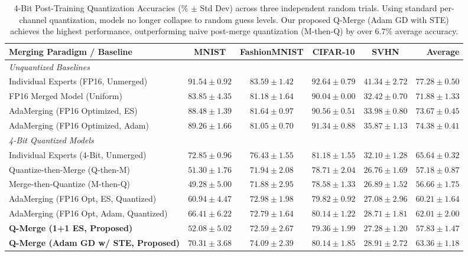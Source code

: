 \begin{table}[t]
\caption{4-Bit Post-Training Quantization Accuracies (\% $\pm$ Std Dev) across three independent random trials. Using standard per-channel quantization, models no longer collapse to random guess levels. Our proposed Q-Merge (Adam GD with STE) achieves the highest performance, outperforming naive post-merge quantization (M-then-Q) by over 6.7\% average accuracy.}
\label{tab:4bit_results}
\vskip 0.15in
\begin{center}
\begin{small}
\begin{sc}
\setlength{\tabcolsep}{4pt}
\begin{tabular}{lccccr}
\toprule
Merging Paradigm / Baseline & MNIST & FashionMNIST & CIFAR-10 & SVHN & \textbf{Average} \\
\midrule
\textit{Unquantized Baselines} \\
Individual Experts (FP16, Unmerged) & $91.54 \pm 0.92$ & $83.59 \pm 1.42$ & $92.64 \pm 0.79$ & $41.34 \pm 2.72$ & $\mathbf{77.28 \pm 0.50}$ \\
FP16 Merged Model (Uniform)      & $83.85 \pm 4.35$ & $81.18 \pm 1.64$ & $90.04 \pm 0.00$ & $32.42 \pm 0.70$ & $\mathbf{71.88 \pm 1.33}$ \\
AdaMerging (FP16 Optimized, ES)  & $88.48 \pm 1.39$ & $81.64 \pm 0.97$ & $90.56 \pm 0.51$ & $33.98 \pm 0.80$ & $\mathbf{73.67 \pm 0.45}$ \\
AdaMerging (FP16 Optimized, Adam)& $89.26 \pm 1.66$ & $81.05 \pm 0.70$ & $91.34 \pm 0.88$ & $35.87 \pm 1.13$ & $\mathbf{74.38 \pm 0.41}$ \\
\midrule
\textit{4-Bit Quantized Models} \\
Individual Experts (4-Bit, Unmerged) & $72.85 \pm 0.96$ & $76.43 \pm 1.55$ & $81.18 \pm 1.55$ & $32.10 \pm 1.28$ & $\mathbf{65.64 \pm 0.32}$ \\
Quantize-then-Merge (Q-then-M)  & $51.30 \pm 1.76$ & $71.94 \pm 2.08$ & $78.71 \pm 2.04$ & $26.76 \pm 1.69$ & $\mathbf{57.18 \pm 0.87}$ \\
Merge-then-Quantize (M-then-Q)  & $49.28 \pm 5.00$ & $71.88 \pm 2.95$ & $78.58 \pm 1.33$ & $26.89 \pm 1.52$ & $\mathbf{56.66 \pm 1.75}$ \\
AdaMerging (FP16 Opt, ES, Quantized) & $60.94 \pm 4.47$ & $72.98 \pm 1.98$ & $79.82 \pm 0.92$ & $27.08 \pm 2.96$ & $\mathbf{60.21 \pm 1.64}$ \\
AdaMerging (FP16 Opt, Adam, Quantized)& $66.41 \pm 6.22$ & $72.79 \pm 1.64$ & $80.14 \pm 1.22$ & $28.71 \pm 1.81$ & $\mathbf{62.01 \pm 2.00}$ \\
\midrule
\textbf{Q-Merge (1+1 ES, Proposed)} & $52.08 \pm 5.02$ & $72.59 \pm 2.67$ & $79.36 \pm 1.99$ & $27.28 \pm 1.20$ & $\mathbf{57.83 \pm 1.47}$ \\
\textbf{Q-Merge (Adam GD w/ STE, Proposed)} & $70.31 \pm 3.68$ & $74.09 \pm 2.39$ & $80.14 \pm 1.85$ & $28.91 \pm 2.72$ & $\mathbf{63.36 \pm 1.18}$ \\
\bottomrule
\end{tabular}
\end{sc}
\end{small}
\end{center}
\vskip -0.1in
\end{table}

